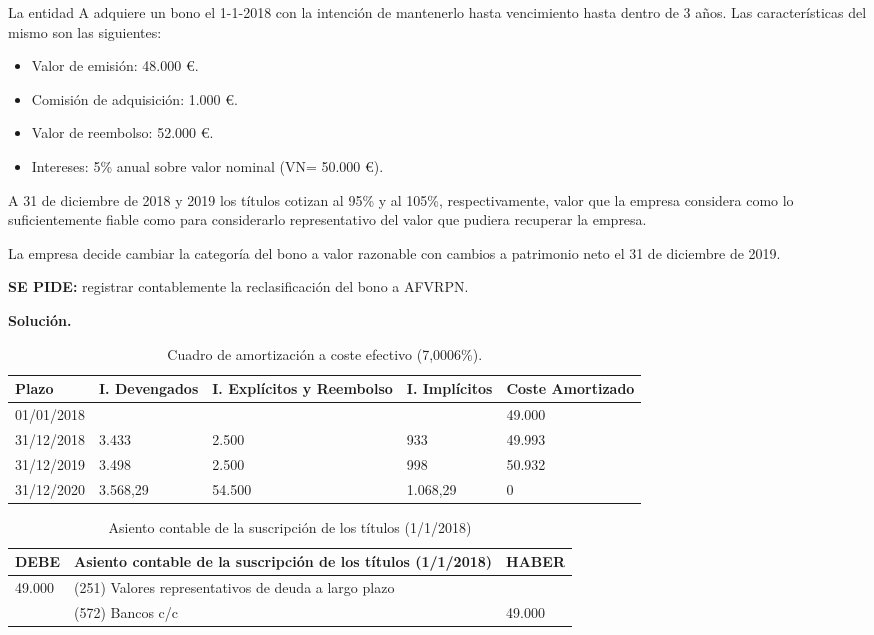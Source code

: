 La entidad A adquiere un bono el 1-1-2018 con la intención de mantenerlo hasta vencimiento hasta dentro de 3 años. Las características del mismo son las siguientes:
\begin{itemize}
    \item Valor de emisión: 48.000 €.
    \item Comisión de adquisición: 1.000 €.
    \item Valor de reembolso: 52.000 €.
    \item Intereses: 5\% anual sobre valor nominal (VN= 50.000 €).
\end{itemize}

A 31 de diciembre de 2018 y 2019 los títulos cotizan al 95\% y al 105\%, respectivamente, valor que la empresa considera como lo suficientemente fiable como para considerarlo representativo del valor que pudiera recuperar la empresa.

La empresa decide cambiar la categoría del bono a valor razonable con cambios a patrimonio neto el 31 de diciembre de 2019.

\textbf{SE PIDE:} registrar contablemente la reclasificación del bono a AFVRPN.

\textbf{Solución.}\\

\begin{table}[H]
    \centering
    \begin{tabular}{|p{2cm}|p{2cm}|p{2cm}|p{2cm}|p{2cm}|}
    \hline
    \rowcolor{blue!30}
    \textbf{Plazo} & \textbf{I. Devengados} & \textbf{I. Explícitos y Reembolso} & \textbf{I. Implícitos} & \textbf{Coste Amortizado} \\
    \hline
    01/01/2018 & & & & 49.000 \\
    \hline
    31/12/2018 & 3.433 & 2.500 & 933 & 49.993 \\
    \hline
    31/12/2019 & 3.498 & 2.500 & 998 & 50.932 \\
    \hline
    31/12/2020 & 3.568,29 & 54.500 & 1.068,29 & 0 \\
    \hline
    \end{tabular}
    \caption{Cuadro de amortización a coste efectivo (7,0006\%).}
    \label{tabla:ejercicio7-asiento1-tema2}
\end{table}



\begin{table}[H]
    \centering
    \begin{tabular}{|p{3cm}|p{6cm}|p{3cm}|}
    \hline
    \rowcolor{blue!30}
    \textbf{DEBE} & \textbf{Asiento contable de la suscripción de los títulos (1/1/2018)} & \textbf{HABER} \\
    \hline
    49.000 & (251) Valores representativos de deuda a largo plazo & \\
    \hline
    & (572) Bancos c/c & 49.000 \\
    \hline
    \end{tabular}
    \caption{Asiento contable de la suscripción de los títulos (1/1/2018)}
    \label{tabla:asiento_suscripcion}
\end{table}

